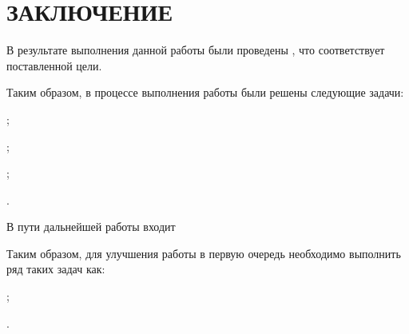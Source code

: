 \chapter*{\centering ЗАКЛЮЧЕНИЕ}


В результате выполнения данной работы были проведены
,
что соответствует поставленной цели.

Таким образом, в процессе выполнения работы были решены следующие задачи:
\begin{itemizePaper}
    \item {};
    \item {};
    \item {};
    \item {}.
\end{itemizePaper}

В пути дальнейшей работы входит

Таким образом, для улучшения работы в первую очередь необходимо выполнить ряд таких задач как:
\begin{itemizePaper}
    \item {};
    \item {}.
\end{itemizePaper}

